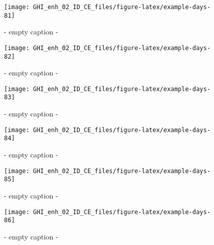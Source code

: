 \documentclass[
  10pt,
  a4paper,oneside]{article}
\begin{document}
\begin{figure}[H]

{\centering \texttt{[image: GHI\_enh\_02\_ID\_CE\_files/figure-latex/example-days-81]} 

}

\caption{ - empty caption - }\label{fig:example-days-81}
\end{figure}

\begin{figure}[H]

{\centering \texttt{[image: GHI\_enh\_02\_ID\_CE\_files/figure-latex/example-days-82]} 

}

\caption{ - empty caption - }\label{fig:example-days-82}
\end{figure}

\begin{figure}[H]

{\centering \texttt{[image: GHI\_enh\_02\_ID\_CE\_files/figure-latex/example-days-83]} 

}

\caption{ - empty caption - }\label{fig:example-days-83}
\end{figure}

\begin{figure}[H]

{\centering \texttt{[image: GHI\_enh\_02\_ID\_CE\_files/figure-latex/example-days-84]} 

}

\caption{ - empty caption - }\label{fig:example-days-84}
\end{figure}

\begin{figure}[H]

{\centering \texttt{[image: GHI\_enh\_02\_ID\_CE\_files/figure-latex/example-days-85]} 

}

\caption{ - empty caption - }\label{fig:example-days-85}
\end{figure}

\begin{figure}[H]

{\centering \texttt{[image: GHI\_enh\_02\_ID\_CE\_files/figure-latex/example-days-86]} 

}

\caption{ - empty caption - }\label{fig:example-days-86}
\end{figure}
\end{document}
